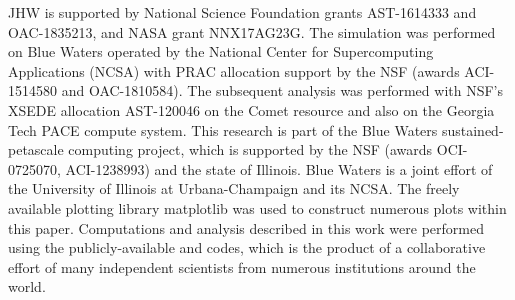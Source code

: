\documentclass[fleqn,usenatbib]{mnras}
\begin{document}
JHW is supported by National Science Foundation grants AST-1614333 and OAC-1835213, and NASA grant NNX17AG23G.  The simulation was performed on Blue
Waters operated by the National Center for Supercomputing Applications (NCSA) with PRAC allocation support by the NSF (awards ACI-1514580 and OAC-1810584). The subsequent analysis was performed with NSF's XSEDE allocation AST-120046 on the Comet resource and also on the Georgia Tech PACE compute system.  This research is part of the Blue Waters sustained-petascale computing project, which is supported by the NSF (awards OCI-0725070, ACI-1238993) and the state of Illinois. Blue Waters is a joint effort of the University of Illinois at Urbana-Champaign and its NCSA.  The freely available plotting library {\sc matplotlib} \citep{matplotlib} was used to construct numerous plots within this paper. Computations and analysis described in this work were performed using the publicly-available \enzo{} and \yt{} codes, which is the product of a collaborative effort of many independent scientists from numerous institutions around the world.










\appendix



\bsp	%
\label{lastpage}
\end{document}
